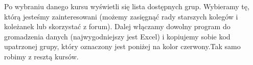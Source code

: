 \documentclass[11pt]{article}
\begin{document}
\vspace{0.2cm}


\vspace{0.1cm}

\indent \hspace{0.5cm} Po wybraniu danego kursu wyświetli się lista dostępnych grup. Wybieramy tę, którą jesteśmy zainteresowani (możemy zasięgnąć rady starszych kolegów i koleżanek lub skorzystać z forum). Dalej włączamy dowolny program do gromadzenia danych
(najwygodniejszy jest Excel) i kopiujemy sobie kod upatrzonej grupy, który oznaczony jest poniżej na kolor czerwony.\linebreak Tak samo robimy z resztą kursów.


\vspace{0.1cm}
\end{document}
